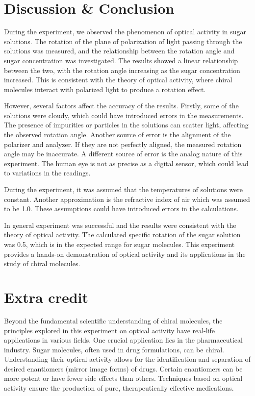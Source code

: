 \documentclass[10pt]{article}
\begin{document}
\section{Discussion \& Conclusion}

During the experiment, we observed the phenomenon of optical activity in sugar solutions. The rotation of the plane of polarization of light passing through the solutions was measured, and the relationship between the rotation angle and sugar concentration was investigated. The results showed a linear relationship between the two, with the rotation angle increasing as the sugar concentration increased. This is consistent with the theory of optical activity, where chiral molecules interact with polarized light to produce a rotation effect.

However, several factors affect the accuracy of the results. Firstly, some of the solutions were cloudy, which could have introduced errors in the measurements. The presence of impurities or particles in the solutions can scatter light, affecting the observed rotation angle. Another source of error is the alignment of the polarizer and analyzer. If they are not perfectly aligned, the measured rotation angle may be inaccurate. A different source of error is the analog nature of this experiment. The human eye is not as precise as a digital sensor, which could lead to variations in the readings.

During the experiment, it was assumed that the temperatures of solutions were constant. Another approximation is the refractive index of air which was assumed to be 1.0. These assumptions could have introduced errors in the calculations.   

In general experiment was successful and the results were consistent with the theory of optical activity. The calculated specific rotation of the sugar solution was 0.5, which is in the expected range for sugar molecules. This experiment provides a hands-on demonstration of optical activity and its applications in the study of chiral molecules.

\section{Extra credit}

Beyond the fundamental scientific understanding of chiral molecules, the principles explored in this experiment on optical activity have real-life applications in various fields. One crucial application lies in the pharmaceutical industry. Sugar molecules, often used in drug formulations, can be chiral. Understanding their optical activity allows for the identification and separation of desired enantiomers (mirror image forms) of drugs. Certain enantiomers can be more potent or have fewer side effects than others. Techniques based on optical activity ensure the production of pure, therapeutically effective medications.
\end{document}
